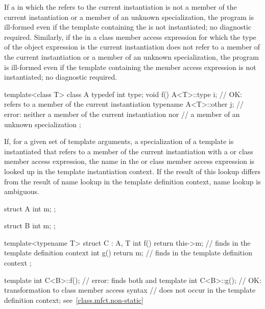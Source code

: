 \pnum
If a  in which the 
refers to the current instantiation is not a member of the current instantiation
or a member of an unknown specialization, the program is ill-formed even if the
template containing the  is not instantiated; no
diagnostic required. Similarly, if the  in a class
member access expression for which the type of the object expression is the
current instantiation does not refer to a member of the current instantiation
or a member of an unknown specialization, the program is ill-formed even if the
template containing the member access expression is not instantiated; no diagnostic
required.
\begin{example}
\begin{codeblock}
template<class T> class A {
  typedef int type;
  void f() {
    A<T>::type i;               // OK: refers to a member of the current instantiation
    typename A<T>::other j;     // error: neither a member of the current instantiation nor
                                // a member of an unknown specialization
  }
};
\end{codeblock}
\end{example}

\pnum
If, for a given set of template arguments, a specialization of a template is
instantiated that refers to a member of the current instantiation with a
 or class member access expression, the name in the
 or class member access expression is looked up in the
template instantiation context. If the result of this lookup differs from the
result of name lookup in the template definition context, name lookup is
ambiguous.
\begin{example}
\begin{codeblock}
struct A {
  int m;
};

struct B {
  int m;
};

template<typename T>
struct C : A, T {
  int f() { return this->m; }   // finds  in the template definition context
  int g() { return m; }         // finds  in the template definition context
};

template int C<B>::f();         // error: finds both  and 
template int C<B>::g();         // OK: transformation to class member access syntax
                                // does not occur in the template definition context; see~\ref{class.mfct.non-static}
\end{codeblock}
\end{example}

